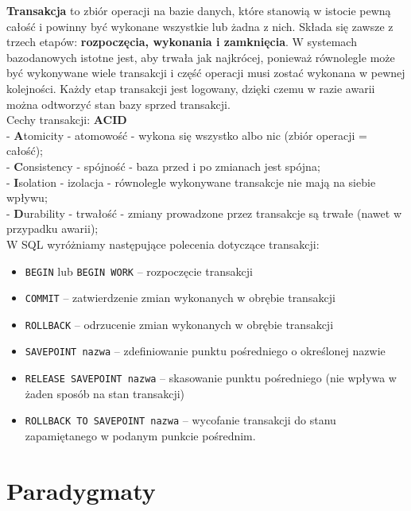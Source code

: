 \documentclass[a4paper,12pt,oneside]{book}
\begin{document}
		\textbf{Transakcja} to zbiór operacji na bazie danych, które stanowią w istocie pewną całość i powinny być wykonane wszystkie lub żadna z nich. Składa się zawsze z trzech etapów: \textbf{rozpoczęcia, wykonania i zamknięcia}. W systemach bazodanowych istotne jest, aby trwała jak najkrócej, ponieważ równolegle może być wykonywane wiele transakcji i część operacji musi zostać wykonana w pewnej kolejności. Każdy etap transakcji jest logowany, dzięki czemu w razie awarii można odtworzyć stan bazy sprzed transakcji. \\
		Cechy transakcji: \textbf{ACID} \\
		- \textbf{A}tomicity - atomowość - wykona się wszystko albo nic (zbiór operacji = całość); \\
		- \textbf{C}onsistency - spójność - baza przed i po zmianach jest spójna; \\
		- \textbf{I}solation - izolacja - równolegle wykonywane transakcje nie mają na siebie wpływu; \\
		- \textbf{D}urability - trwałość - zmiany prowadzone przez transakcje są trwałe (nawet w przypadku awarii);\\
		W SQL wyróżniamy następujące polecenia dotyczące transakcji:
		\begin{itemize}
			\itemsep 0em
			\item \verb*|BEGIN| lub \verb*|BEGIN WORK| – rozpoczęcie transakcji
			\item \verb*|COMMIT| – zatwierdzenie zmian wykonanych w obrębie transakcji
			\item \verb*|ROLLBACK| – odrzucenie zmian wykonanych w obrębie transakcji
			\item \verb*|SAVEPOINT nazwa| – zdefiniowanie punktu pośredniego o określonej nazwie
			\item \verb*|RELEASE SAVEPOINT nazwa| – skasowanie punktu pośredniego (nie wpływa w żaden sposób na stan transakcji)
			\item \verb*|ROLLBACK TO SAVEPOINT nazwa| – wycofanie transakcji do stanu zapamiętanego w podanym punkcie pośrednim.
		\end{itemize}
		\newpage\section{Paradygmaty}
\end{document}
